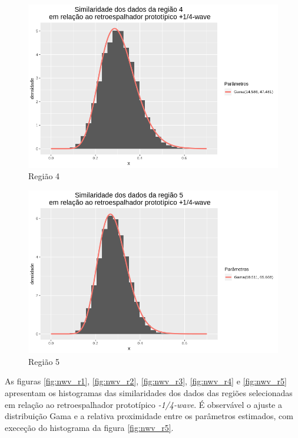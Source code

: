\documentclass[12pt]{article}
\begin{document}
\begin{figure}[!h]
    \centering
    \vspace{0.1\linewidth}
    \includegraphics[width = \linewidth]{../../Images/Report_18_12_20/pwv_region4.png}
    \caption{Região 4}
    \label{fig:pwv_r4}
\end{figure}

\begin{figure}[!h]
    \centering
    \vspace{0.1\linewidth}
    \includegraphics[width = \linewidth]{../../Images/Report_18_12_20/pwv_region5.png}
    \caption{Região 5}
    \label{fig:pwv_r5}
\end{figure}

As figuras \ref{fig:nwv_r1}, \ref{fig:nwv_r2}, \ref{fig:nwv_r3}, \ref{fig:nwv_r4} e \ref{fig:nwv_r5} apresentam os histogramas das similaridades dos dados das regiões selecionadas  em relação ao retroespalhador prototípico \textit{-1/4-wave}. É observável o ajuste a distribuição Gama e a relativa proximidade entre os parâmetros estimados, com execeção do histograma da figura \ref{fig:nwv_r5}.
\end{document}
